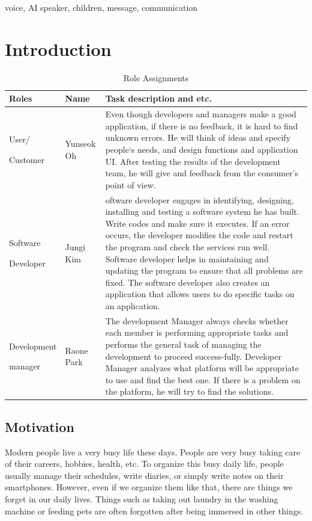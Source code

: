 \documentclass[conference]{IEEEtran}
\begin{document}
\begin{IEEEkeywords}
voice, AI speaker, children, message, communication
\end{IEEEkeywords}

\section{Introduction}

\begin{table}[ht!]
\caption{Role Assignments}
\def\arraystretch{1.24} \small
    \begin{tabular}{|p{1.8cm}|p{1.4cm}|p{4.4cm}|}
    \hline
    Roles & Name & Task description and etc. \\ \hline
    User/\par Customer&  Yunseok Oh & Even though developers and managers make a good application, if there is no feedback, it is hard to find unknown errors. He will think of ideas and specify people`s needs, and design functions and application UI. After testing the results of the development team, he will give and feedback from the consumer's point of view. \\ \hline
    
    Software \par Developer & Jungi Kim & oftware developer engages in identifying, designing, installing and testing a software system he has built.  Write codes and make sure it executes. If an error occurs, the developer modifies the code and restart the program and check the services run well. Software developer helps in maintaining and updating the program to ensure that all problems are fixed. The software developer also creates an application that allows users to do specific tasks on an application. \\ \hline
    
    Development \par manager & Raone Park & The development Manager always checks whether each member is performing appropriate tasks and performs the general task of managing the development to proceed success-fully. Developer Manager analyzes what platform will be appropriate to use and find the best one. If there is a problem on the platform, he will try to find the solutions. \\ \hline
    \end{tabular}
\end{table}

\subsection{Motivation}
Modern people live a very busy life these days. People are very busy taking care of their careers, hobbies, health, etc. To organize this busy daily life, people usually manage their schedules, write diaries, or simply write notes on their smartphones. However, even if we organize them like that, there are things we forget in our daily lives. Things such as taking out laundry in the washing machine or feeding pets are often forgotten after being immersed in other things. 
\end{document}
